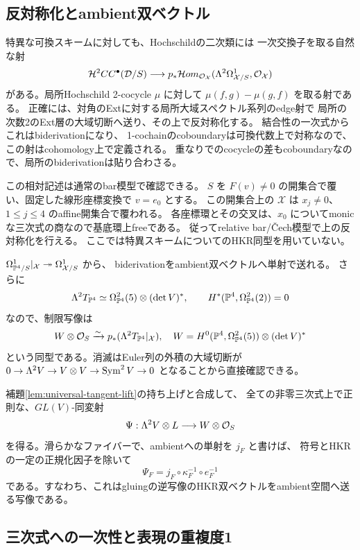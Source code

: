 \subsection{反対称化とambient双ベクトル}

特異な可換スキームに対しても、Hochschildの二次類には
一次交換子を取る自然な射
\[
 \mathcal H^2CC^\bullet(\mathcal D/S)
 \longrightarrow
 p_*\mathcal H om_{\mathcal O_{\mathcal X}}
   (\Lambda^2\Omega^1_{\mathcal X/S},\mathcal O_{\mathcal X})
\]
がある。局所Hochschild 2-cocycle $\mu$ に対して
$\mu(f,g)-\mu(g,f)$ を取る射である。
正確には、対角のExtに対する局所大域スペクトル系列のedge射で
局所の次数2のExt層の大域切断へ送り、その上で反対称化する。
結合性の一次式からこれはbiderivationになり、
1-cochainのcoboundaryは可換代数上で対称なので、この射はcohomology上で定義される。
重なりでのcocycleの差もcoboundaryなので、局所のbiderivationは貼り合わさる。

この相対記述は通常のbar模型で確認できる。
$S$ を $F(v)\ne0$ の開集合で覆い、固定した線形座標変換で $v=e_0$ とする。
この開集合上の $\mathcal X$ は $x_j\ne0$、$1\le j\le4$ のaffine開集合で覆われる。
各座標環とその交叉は、$x_0$ についてmonicな三次式の商なので基底環上freeである。
従ってrelative bar/\v Cech模型で上の反対称化を行える。
ここでは特異スキームについてのHKR同型を用いていない。

$\Omega^1_{\mathbb P^4/S}|_{\mathcal X}\twoheadrightarrow\Omega^1_{\mathcal X/S}$ から、
biderivationをambient双ベクトルへ単射で送れる。
さらに
\[
 \Lambda^2T_{\mathbb P^4}\simeq\Omega^2_{\mathbb P^4}(5)\otimes(\det V)^*,
 \qquad H^*(\mathbb P^4,\Omega^2_{\mathbb P^4}(2))=0
\]
なので、制限写像は
\[
 W\otimes\mathcal O_S\xrightarrow{\sim}
 p_*(\Lambda^2T_{\mathbb P^4}|_{\mathcal X}),
 \quad W=H^0(\mathbb P^4,\Omega^2_{\mathbb P^4}(5))\otimes(\det V)^*
\]
という同型である。消滅はEuler列の外積の大域切断が
$0\to\Lambda^2V\to V\otimes V\to\operatorname{Sym}^2V\to0$ となることから直接確認できる。

補題\ref{lem:universal-tangent-lift}の持ち上げと合成して、
全ての非零三次式上で正則な、$GL(V)$-同変射
\[
 \Psi:\Lambda^2V\otimes L\longrightarrow W\otimes\mathcal O_S
\]
を得る。滑らかなファイバーで、ambientへの単射を $j_F$ と書けば、
符号とHKRの一定の正規化因子を除いて
\[
                         \Psi_F=j_F\circ\kappa_F^{-1}\circ e_F^{-1}
\]
である。すなわち、これはgluingの逆写像のHKR双ベクトルをambient空間へ送る写像である。

\subsection{三次式への一次性と表現の重複度1}

